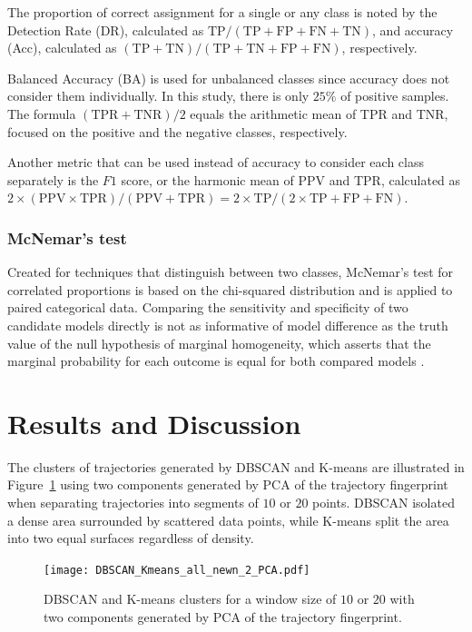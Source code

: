 \documentclass[preprint,12pt]{elsarticle}
\begin{document}
The proportion of correct assignment for a single or any class is noted by the Detection Rate (DR), calculated as $\mathrm{TP}/(\mathrm{TP}+\mathrm{FP}+\mathrm{FN}+\mathrm{TN})$, and accuracy (Acc), calculated as $(\mathrm{TP} + \mathrm{TN}) / (\mathrm{TP} + \mathrm{TN} + \mathrm{FP} + \mathrm{FN})$, respectively.

Balanced Accuracy (BA) \cite{velez2007balanced} is used for unbalanced classes since accuracy does not consider them individually. In this study, there is only $25\%$ of positive samples. The formula $(\mathrm{TPR} + \mathrm{TNR}) / 2$ equals the arithmetic mean of TPR and TNR, focused on the positive and the negative classes, respectively.

Another metric that can be used instead of accuracy to consider each class separately is the $F1$ score, or the harmonic mean of PPV and TPR, calculated as $2 \times (\mathrm{PPV} \times \mathrm{TPR}) / (\mathrm{PPV} + \mathrm{TPR}) = 2 \times \mathrm{TP} / (2 \times \mathrm{TP} + \mathrm{FP} + \mathrm{FN})$.

\subsubsection{McNemar's test}

Created for techniques that distinguish between two classes, McNemar's test for correlated proportions is based on the chi-squared distribution and is applied to paired categorical data. Comparing the sensitivity and specificity of two candidate models directly is not as informative of model difference as the truth value of the null hypothesis of marginal homogeneity, which asserts that the marginal probability for each outcome is equal for both compared models \cite{mcnemar1947note}.

\section{Results and Discussion}
\label{sec:Results}
 
The clusters of trajectories generated by DBSCAN and K-means are illustrated in Figure~\ref{fig:10_20_DBSCAN_PCA} using two components generated by PCA of the trajectory fingerprint when separating trajectories into segments of $10$ or $20$ points. DBSCAN isolated a dense area surrounded by scattered data points, while K-means split the area into two equal surfaces regardless of density.

\begin{figure}[!ht]
    \centering
    \texttt{[image: DBSCAN\_Kmeans\_all\_newn\_2\_PCA.pdf]}
    \caption{DBSCAN and K-means clusters for a window size of $10$ or $20$ with two components generated by PCA of the trajectory fingerprint.}
    \label{fig:10_20_DBSCAN_PCA}
\end{figure}
\end{document}
